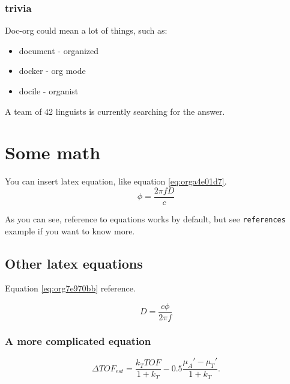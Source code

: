 \subsubsection{trivia}
\label{sec:orgfe27cc5}
Doc-org could mean a lot of things, such as:
\begin{itemize}
\item document - organized
\item docker - org mode
\item docile - organist
\end{itemize}
A team of 42 linguists is currently searching for the answer.

\section{Some math}
\label{sec:org6b19277}
You can insert latex equation, like equation \ref{eq:orga4e01d7}.
\begin{equation}
\label{eq:orga4e01d7}
\phi = \frac{2\pi fD}{c}
\end{equation}

As you can see, reference to equations works by default, but see \texttt{references}
example if you want to know more.

\subsection{Other latex equations}
\label{sec:org03a902d}
Equation \ref{eq:org7e970bb} reference.

\begin{equation}
\label{eq:org7e970bb}
D = \frac{c\phi}{2\pi f}
\end{equation}

\subsubsection{A more complicated equation}
\label{sec:org5d03697}

\begin{equation}
\Delta TOF_{est} = \frac{k_T TOF}{1+k_T } - 0.5 \frac{\mu_A' - \mu_T'}{1+k_T}.
\end{equation}



